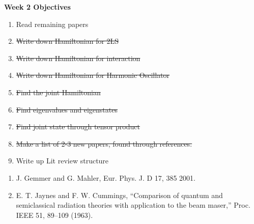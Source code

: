 \documentclass{article}
\begin{document}
\Large{\textbf{Week 2 Objectives}}
\\
\begin{enumerate}
    \item Read remaining papers
    \item\sout{Write down Hamiltonian for 2LS}
    \item \sout{Write down Hamiltonian for interaction}
    \item \sout{Write down Hamiltonian for Harmonic Oscillator}
    \item \sout{Find the joint Hamiltonian }
    \item \sout{Find eigenvalues and eigenstates}
    \item \sout{Find joint state through tensor product}
    \item \sout{Make a list of 2-3 new papers, found through references.}
    \item Write up Lit review structure


\end{enumerate}

\small{
\begin{enumerate}
    \item J. Gemmer and G. Mahler, Eur. Phys. J. D 17, 385 2001.
    \item E. T. Jaynes and F. W. Cummings, “Comparison of quantum and semiclassical
radiation theories with application to the beam maser,” Proc.
IEEE 51, 89–109 (1963).
\end{enumerate}}
\end{document}
